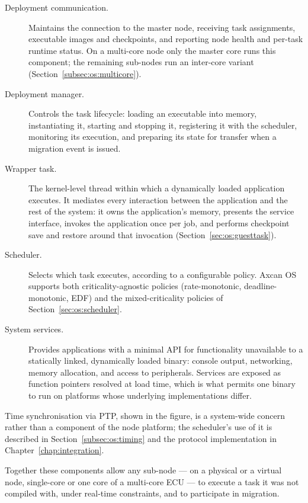 \begin{description}
  \item[Deployment communication.] Maintains the connection to the
    master node, receiving task assignments, executable images and
    checkpoints, and reporting node health and per-task runtime status.
    On a multi-core node only the master core runs this component; the
    remaining sub-nodes run an inter-core variant
    (Section~\ref{subsec:os:multicore}).

  \item[Deployment manager.] Controls the task lifecycle: loading an
    executable into memory, instantiating it, starting and stopping it,
    registering it with the scheduler, monitoring its execution, and
    preparing its state for transfer when a migration event is issued.

  \item[Wrapper task.] The kernel-level thread within which a dynamically
    loaded application executes. It mediates every interaction between the
    application and the rest of the system: it owns the application's memory,
    presents the service interface, invokes the application once per job, and
    performs checkpoint save and restore around that invocation
    (Section~\ref{sec:os:guesttask}).

  \item[Scheduler.] Selects which task executes, according to a configurable
    policy. Axcan OS supports both criticality-agnostic policies
    (rate-monotonic, deadline-monotonic, EDF) and the mixed-criticality
    policies of Section~\ref{sec:os:scheduler}.

  \item[System services.] Provides applications with a minimal API for
    functionality unavailable to a statically linked, dynamically loaded
    binary: console output, networking, memory allocation, and access to
    peripherals. Services are exposed as function pointers resolved at load
    time, which is what permits one binary to run on platforms whose
    underlying implementations differ.
\end{description}

Time synchronisation via PTP, shown in the figure, is a system-wide concern
rather than a component of the node platform; the scheduler's use of it is
described in Section~\ref{subsec:os:timing} and the protocol implementation in
Chapter~\ref{chap:integration}.

Together these components allow any sub-node --- on a physical or a virtual
node, single-core or one core of a multi-core ECU --- to execute a task it was
not compiled with, under real-time constraints, and to participate in
migration.

